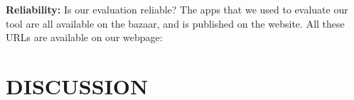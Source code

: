 \documentclass[article]{sigplanconf}
\begin{document}
\textbf{Reliability:} Is our evaluation reliable? The apps that we used to evaluate our tool are all available on the \TD bazaar, and \tool is published on the \TD website. All these URLs are available on our webpage: \\


\section{DISCUSSION}
\label{sec:discussion}

%
%
\end{document}
